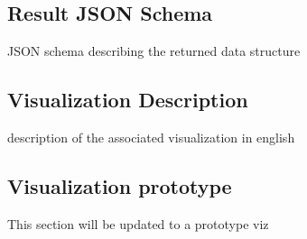 \documentclass{article}
\begin{document}
  \subsection{Result JSON Schema}
  JSON schema describing the returned data structure
  \subsection{Visualization Description}
  description of the associated visualization in english
  \subsection{Visualization prototype}
  This section will be updated to a prototype viz
\end{document}
